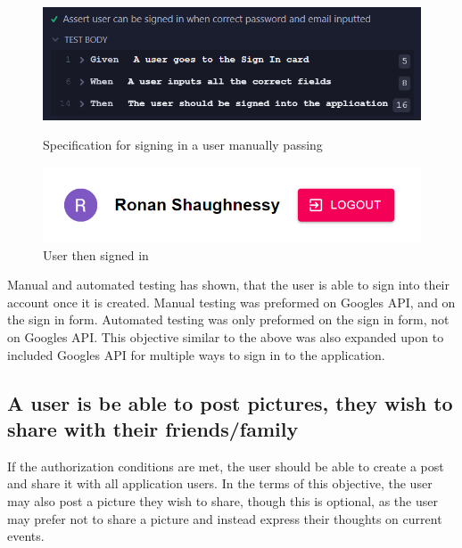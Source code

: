 \begin{figure}[ht]
\begin{minipage}[b]{0.5\linewidth}
    \centering
    \includegraphics[width=\linewidth]{images/signinPass}
    \caption{Specification for signing in a user manually passing}
\end{minipage}
    \hspace{0.5cm}
    \begin{minipage}[b]{0.3\linewidth}
    \centering
   \includegraphics[width=\linewidth]{images/SignedIn}
    \caption{User then signed in}
\end{minipage}
\end{figure}

Manual and automated testing has shown, that the user is able to sign into their account once it is created. Manual testing was preformed on Googles API, and on the sign in form. Automated testing was only preformed on the sign in form, not on Googles API. This objective similar to the above was also expanded upon to included Googles API for multiple ways to sign in to the application.

\subsection{A user is be able to post pictures, they wish to share with their friends/family}
If the authorization conditions are met, the user should be able to create a post and share it with all application users. In the terms of this objective, the user may also post a picture they wish to share, though this is optional, as the user may prefer not to share a picture and instead express their thoughts on current events.

